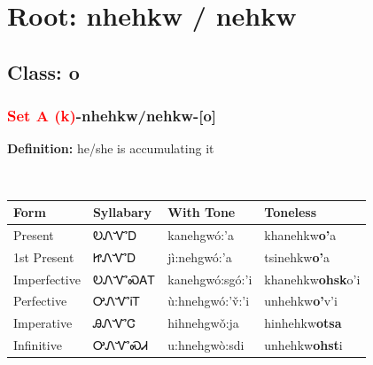 \needspace{4in}
\section*{Root: nhehkw / nehkw}
\nopagebreak
{}
\needspace{3in}
\subsection*{Class: o}
\nopagebreak
\needspace{2in}
\subsubsection*{\textcolor{Red}{Set A (k)}{-}\textbf{nhehkw/nehkw}{-}[o]}
\nopagebreak
\textbf{Definition: } he/she is accumulating it
\\[0.5em]
\begin{tabularx}{\textwidth}{l X X X}%
\toprule%
\textbf{Form}&\textbf{Syllabary}&\textbf{With Tone}&\textbf{Toneless}\\%
\midrule%
Present&ᎧᏁᏉᎠ&kanehgwó:’a&khanehkw\textbf{o'}a\\%
1st Present&ᏥᏁᏉᎠ&jì:nehgwó:’a&tsinehkw\textbf{o'}a\\%
Imperfective&ᎧᏁᏉᏍᎪᎢ&kanehgwó:sgó:’i&khanehkw\textbf{ohsk}o'i\\%
Perfective&ᎤᏁᏉᎥᎢ&ù:hnehgwó:’v̌:’i&unhehkw\textbf{o'}v'i\\%
Imperative&ᎯᏁᏉᏣ&hihnehgwǒ:ja&hinhehkw\textbf{otsa}\\%
Infinitive&ᎤᏁᏉᏍᏗ&u:hnehgwò:sdi&unhehkw\textbf{ohst}i\\%
\bottomrule%
\end{tabularx}
\\[1em]